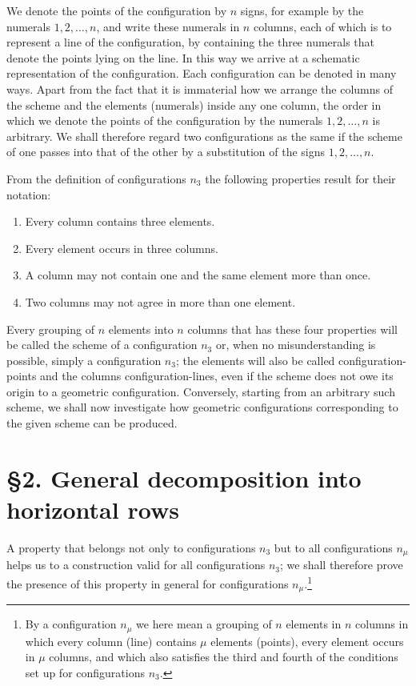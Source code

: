 \documentclass[11pt]{article}
\begin{document}
We denote the points of the configuration by $n$ signs, for example by the numerals $1,2,\ldots,n$, and write these numerals in $n$ columns, each of which is to represent a line of the configuration, by containing the three numerals that denote the points lying on the line. In this way we arrive at a schematic representation of the configuration. Each configuration can be denoted in many ways. Apart from the fact that it is immaterial how we arrange the columns of the scheme and the elements (numerals) inside any one column, the order in which we denote the points of the configuration by the numerals $1,2,\ldots,n$ is arbitrary. We shall therefore regard two configurations as the same if the scheme of one passes into that of the other by a substitution of the signs $1,2,\ldots,n$.

From the definition of configurations $n_3$ the following properties result for their notation:
\begin{enumerate}
\item Every column contains three elements.
\item Every element occurs in three columns.
\item A column may not contain one and the same element more than once.
\item Two columns may not agree in more than one element.
\end{enumerate}

Every grouping of $n$ elements into $n$ columns that has these four properties will be called the scheme of a configuration $n_3$ or, when no misunderstanding is possible, simply a configuration $n_3$; the elements will also be called configuration-points and the columns configuration-lines, even if the scheme does not owe its origin to a geometric configuration. Conversely, starting from an arbitrary such scheme, we shall now investigate how geometric configurations corresponding to the given scheme can be produced.

\section*{\S 2. General decomposition into horizontal rows}
A property that belongs not only to configurations $n_3$ but to all configurations $n_\mu$ helps us to a construction valid for all configurations $n_3$; we shall therefore prove the presence of this property in general for configurations $n_\mu$.\footnote{By a configuration $n_\mu$ we here mean a grouping of $n$ elements in $n$ columns in which every column (line) contains $\mu$ elements (points), every element occurs in $\mu$ columns, and which also satisfies the third and fourth of the conditions set up for configurations $n_3$.}
\end{document}
